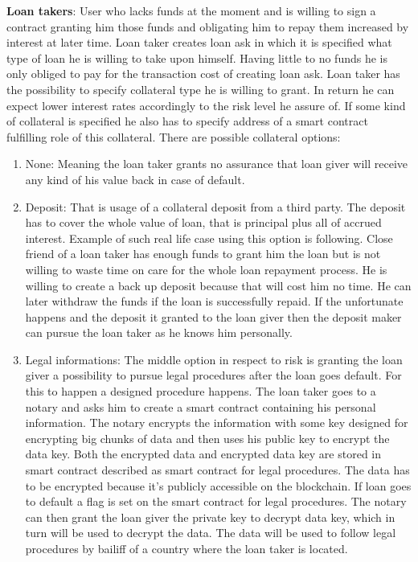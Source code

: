 \documentclass[a4paper,12pt,twoside,openany]{report}
\begin{document}
\textbf{Loan takers}: User who lacks funds at the moment and is willing to sign a contract granting him those funds and obligating him to repay them increased by interest at later time. Loan taker creates loan ask in which it is specified what type of loan he is willing to take upon himself. Having little to no funds he is only obliged to pay for the transaction cost of creating loan ask. Loan taker has the possibility to specify collateral type he is willing to grant. In return he can expect lower interest rates accordingly to the risk level he assure of. If some kind of collateral is specified he also has to specify address of a smart contract fulfilling role of this collateral. There are possible collateral options:
\begin{enumerate}
\item None: Meaning the loan taker grants no assurance that loan giver will receive any kind of his value back in case of default.
\item Deposit: That is usage of a collateral deposit from a third party. The deposit has to cover the whole value of loan, that is principal plus all of accrued interest. Example of such real life case using this option is following. Close friend of a loan taker has enough funds to grant him the loan but is not willing to waste time on care for the whole loan repayment process. He is willing to create a back up deposit because that will cost him no time. He can later withdraw the funds if the loan is successfully repaid. If the unfortunate happens and the deposit it granted to the loan giver then the deposit maker can pursue the loan taker as he knows him personally. 
\item Legal informations: The middle option in respect to risk is granting the loan giver a possibility to pursue legal procedures after the loan goes default. For this to happen a designed procedure happens. The loan taker goes to a notary and asks him to create a smart contract containing his personal information. The notary encrypts the information with some key designed for encrypting big chunks of data and then uses his public key to encrypt the data key. Both the encrypted data and encrypted data key are stored in smart contract described as smart contract for legal procedures. The data has to be encrypted because it's publicly accessible on the blockchain. If loan goes to default a flag is set on the smart contract for legal procedures. The notary can then grant the loan giver the private key to decrypt data key, which in turn will be used to decrypt the data. The data will be used to follow legal procedures by bailiff of a country where the loan taker is located.
\end{enumerate}
\end{document}
